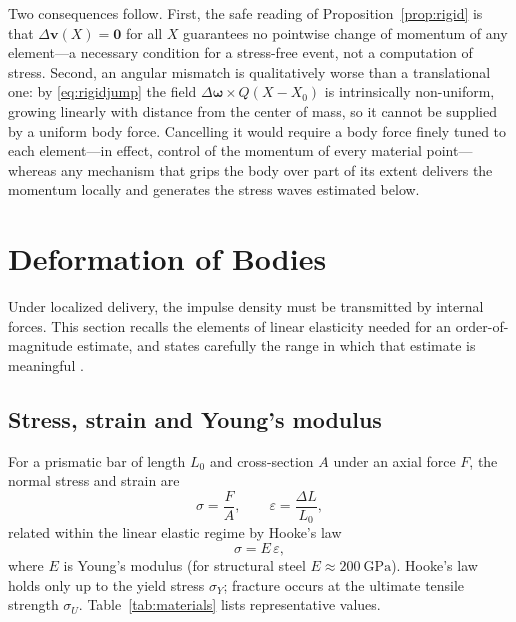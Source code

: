 \documentclass[11pt]{article}
\begin{document}
	Two consequences follow. First, the safe reading of
	Proposition~\ref{prop:rigid} is that $\Delta\mathbf v(X)=\mathbf 0$ for
	all $X$ guarantees no pointwise change of momentum of any element---a
	necessary condition for a stress-free event, not a computation of
	stress. Second, an angular mismatch is qualitatively worse than a
	translational one: by \eqref{eq:rigidjump} the field
	$\Delta\boldsymbol\omega\times Q(X-X_0)$ is intrinsically
	non-uniform, growing linearly with distance from the center of mass, so
	it cannot be supplied by a uniform body force. Cancelling it would
	require a body force finely tuned to each element---in effect, control
	of the momentum of every material point---whereas any mechanism that
	grips the body over part of its extent delivers the momentum locally and
	generates the stress waves estimated below.
	
	\section{Deformation of Bodies}
	\label{sec:deformation}
	
	Under localized delivery, the impulse density must be transmitted by
	internal forces. This section recalls the elements of linear elasticity
	needed for an order-of-magnitude estimate, and states carefully the
	range in which that estimate is meaningful
	\cite{LandauLifshitzElasticity,Gere2012,TimoshenkoGoodier1970}.
	
	\subsection{Stress, strain and Young's modulus}
	
	For a prismatic bar of length $L_0$ and cross-section $A$ under an axial
	force $F$, the normal stress and strain are
	\begin{equation}
		\sigma=\frac{F}{A},
		\qquad
		\varepsilon=\frac{\Delta L}{L_0},
		\label{eq:stressstrain}
	\end{equation}
	related within the linear elastic regime by Hooke's law
	\begin{equation}
		\sigma=E\,\varepsilon,
		\label{eq:hooke}
	\end{equation}
	where $E$ is Young's modulus (for structural steel $E\approx 200\
	\mathrm{GPa}$). Hooke's law holds only up to the yield stress
	$\sigma_Y$; fracture occurs at the ultimate tensile strength
	$\sigma_U$. Table~\ref{tab:materials} lists representative values.
	
\end{document}
